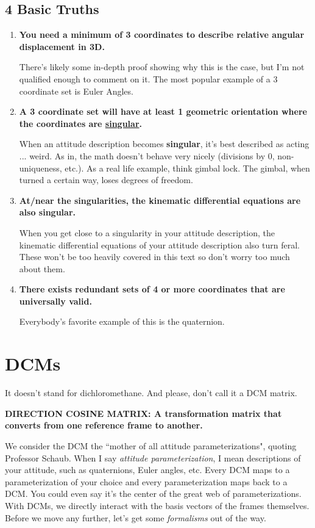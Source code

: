 \documentclass[a4paper,14pt]{extreport}
\begin{document}
\section{4 Basic Truths}
\begin{enumerate}
\item \textbf{You need a minimum of 3 coordinates to describe relative angular displacement in 3D.} 

There's likely some in-depth proof showing why this is the case, but I'm not qualified enough to comment on it. The most popular example of a 3 coordinate set is Euler Angles.

\item \textbf{A 3 coordinate set will have at least 1 geometric orientation where the coordinates are \underline{singular}.} 

When an attitude description becomes \textbf{singular}, it's best described as acting ... weird. As in, the math doesn't behave very nicely (divisions by 0, non-uniqueness, etc.). As a real life example, think gimbal lock. The gimbal, when turned a certain way, loses degrees of freedom.

\item \textbf{At/near the singularities, the kinematic differential equations are also singular.} 

When you get close to a singularity in your attitude description, the kinematic differential equations of your attitude description also turn feral. These won't be too heavily covered in this text so don't worry too much about them.

\item \textbf{There exists redundant sets of 4 or more coordinates that are universally valid.}

Everybody's favorite example of this is the quaternion.

\end{enumerate}
\chapter{DCMs}

It doesn't stand for dichloromethane. And please, don't call it a DCM matrix.

\begin{center}
\textbf{DIRECTION COSINE MATRIX: A transformation matrix that converts from one reference frame to another.}
\end{center}

We consider the DCM the ``mother of all attitude parameterizations", quoting Professor Schaub. When I say \emph{attitude parameterization}, I mean descriptions of your attitude, such as quaternions, Euler angles, etc. Every DCM maps to a parameterization of your choice and every parameterization maps back to a DCM. You could even say it's the center of the great web of parameterizations. With DCMs, we directly interact with the basis vectors of the frames themselves. Before we move any further, let's get some \emph{formalisms} out of the way.
\end{document}
